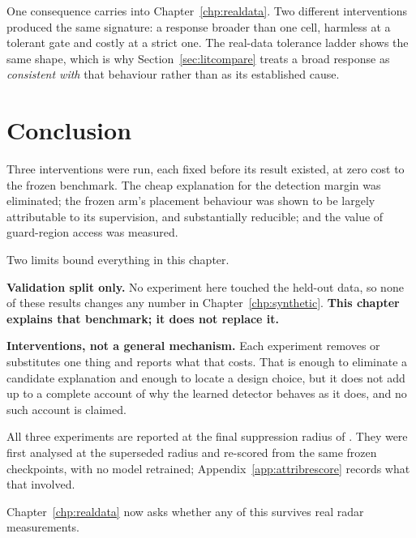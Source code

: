 One consequence carries into Chapter~\ref{chp:realdata}. Two different interventions produced the
same signature: a response broader than one cell, harmless at a tolerant gate and costly at a strict
one. The real-data tolerance ladder shows the same shape, which is why
Section~\ref{sec:litcompare} treats a broad response as \emph{consistent with} that behaviour rather
than as its established cause.

\section{Conclusion}
\label{sec:attrib_scope}

Three interventions were run, each fixed before its result existed, at zero cost to the frozen
benchmark. The cheap explanation for the detection margin was eliminated; the frozen arm's placement
behaviour was shown to be largely attributable to its supervision, and substantially reducible; and
the value of guard-region access was measured.

Two limits bound everything in this chapter.

\textbf{Validation split only.} No experiment here touched the held-out data, so none of these
results changes any number in Chapter~\ref{chp:synthetic}. \textbf{This chapter explains that
benchmark; it does not replace it.}

\textbf{Interventions, not a general mechanism.} Each experiment removes or substitutes one thing
and reports what that costs. That is enough to eliminate a candidate explanation and enough to
locate a design choice, but it does not add up to a complete account of why the learned detector
behaves as it does, and no such account is claimed.

All three experiments are reported at the final suppression radius of \ProtocolNms{}. They were
first analysed at the superseded radius \ProtocolNmsOriginal{} and re-scored from the same frozen
checkpoints, with no model retrained; Appendix~\ref{app:attribrescore} records what that involved.

Chapter~\ref{chp:realdata} now asks whether any of this survives real radar measurements.
